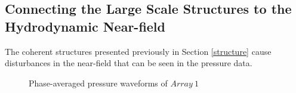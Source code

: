 \documentclass[english]{aiaa-tc}
\begin{document}
\subsection{Connecting the Large Scale Structures to the Hydrodynamic Near-field}
The coherent structures presented previously in Section \ref{structure} cause disturbances in the near-field that can be seen in the pressure data.
\begin{figure}
\begin{center}
\begin{centering}

\end{centering}
\caption{Phase-averaged pressure waveforms of $Array~1$}
\label{fig:phaseaxialbothM}
\end{center}
\end{figure}
\end{document}

